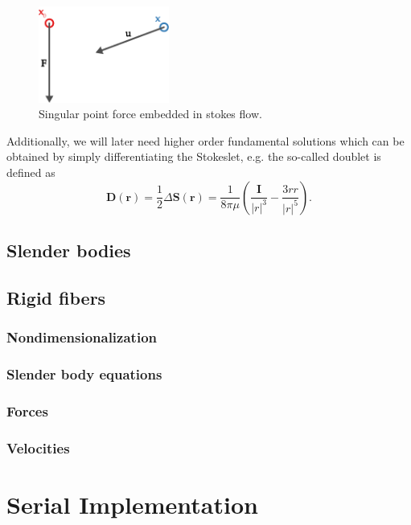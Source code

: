 \documentclass[a4paper,11pt]{kth-mag}
\begin{document}
\begin{figure}
  \centering
  \includegraphics[width=0.3819660112501450000000\textwidth]{img/stokeslet.pdf}
  \caption{Singular point force embedded in stokes flow.}
  \label{fig:stokeslet}
\end{figure}

Additionally, we will later need higher order fundamental solutions which can be obtained by simply differentiating the Stokeslet, e.g. the so-called doublet is defined as
\begin{equation}
  \label{eq:doublet}
  \mathbf{D}(\mathbf{r}) = \frac{1}{2} \Delta\mathbf{S}(\mathbf{r}) = \frac{1}{8\pi\mu} \left(\frac{\mathbf{I}}{|r|^3} - \frac{3rr}{|r|^5}\right) \text{.}
\end{equation}

\section{Slender bodies}
\section{Rigid fibers}
\subsection{Nondimensionalization}
\subsection{Slender body equations}
\subsection{Forces}
\subsection{Velocities}

\chapter{Serial Implementation}
\label{cha:serial_implementation}
\end{document}
